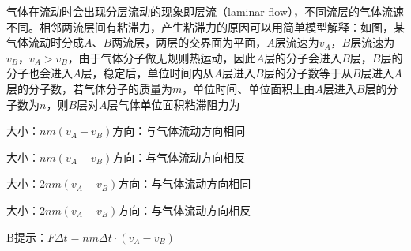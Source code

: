 气体在流动时会出现分层流动的现象即层流（laminar flow），不同流层的气体流速不同。相邻两流层间有粘滞力，产生粘滞力的原因可以用简单模型解释：如图，某气体流动时分成\(A\)、\(B\)两流层，两层的交界面为平面，\(A\)层流速为\(v_A\)，\(B\)层流速为\(v_B\)，\(v_A > v_B\)，由于气体分子做无规则热运动，因此\(A\)层的分子会进入\(B\)层，\(B\)层的分子也会进入\(A\)层，稳定后，单位时间内从\(A\)层进入\(B\)层的分子数等于从\(B\)层进入\(A\)层的分子数，若气体分子的质量为\(m\)，单位时间、单位面积上由\(A\)层进入\(B\)层的分子数为\(n\)，则\(B\)层对\(A\)层气体单位面积粘滞阻力为\paren[]

\begin{choices}
	\item 大小：\(nm(v_A - v_B)\)方向：与气体流动方向相同
	\item 大小：\(nm(v_A - v_B)\)方向：与气体流动方向相反
	\item 大小：\(2nm(v_A - v_B)\)方向：与气体流动方向相同
	\item 大小：\(2nm(v_A - v_B)\)方向：与气体流动方向相反
\end{choices}
\begin{answer}
    B\qquad 提示：\(F\Delta t = nm\Delta t\cdot(v_A -v_B)\)
\end{answer}